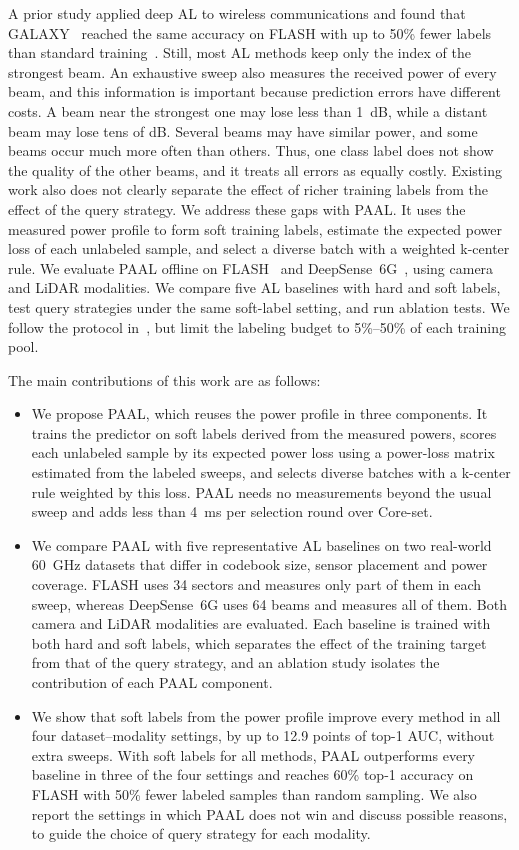 \documentclass[journal,onecolumn]{IEEEtran}
\begin{document}
A prior study applied deep AL to wireless communications and found that GALAXY~\cite{zhang2022galaxy} reached the same accuracy on FLASH with up to 50\% fewer labels than standard training~\cite{soltani2024learning}. Still, most AL methods keep only the index of the strongest beam. An exhaustive sweep also measures the received power of every beam, and this information is important because prediction errors have different costs. A beam near the strongest one may lose less than 1~dB, while a distant beam may lose tens of dB. Several beams may have similar power, and some beams occur much more often than others. Thus, one class label does not show the quality of the other beams, and it treats all errors as equally costly. Existing work also does not clearly separate the effect of richer training labels from the effect of the query strategy. We address these gaps with PAAL. It uses the measured power profile to form soft training labels, estimate the expected power loss of each unlabeled sample, and select a diverse batch with a weighted k-center rule. We evaluate PAAL offline on FLASH~\cite{salehi2022flash} and DeepSense~6G~\cite{alkhateeb2023deepsense}, using camera and LiDAR modalities. We compare five AL baselines with hard and soft labels, test query strategies under the same soft-label setting, and run ablation tests. We follow the protocol in~\cite{soltani2024learning}, but limit the labeling budget to 5\%--50\% of each training pool.

The main contributions of this work are as follows:
\begin{itemize}
  \item We propose PAAL, which reuses the power profile in three components. It trains the predictor on soft labels derived from the measured powers, scores each unlabeled sample by its expected power loss using a power-loss matrix estimated from the labeled sweeps, and selects diverse batches with a k-center rule weighted by this loss. PAAL needs no measurements beyond the usual sweep and adds less than 4~ms per selection round over Core-set.
  \item We compare PAAL with five representative AL baselines on two real-world 60~GHz datasets that differ in codebook size, sensor placement and power coverage. FLASH uses 34 sectors and measures only part of them in each sweep, whereas DeepSense~6G uses 64 beams and measures all of them. Both camera and LiDAR modalities are evaluated. Each baseline is trained with both hard and soft labels, which separates the effect of the training target from that of the query strategy, and an ablation study isolates the contribution of each PAAL component.
  \item We show that soft labels from the power profile improve every method in all four dataset--modality settings, by up to 12.9 points of top-1 AUC, without extra sweeps. With soft labels for all methods, PAAL outperforms every baseline in three of the four settings and reaches 60\% top-1 accuracy on FLASH with 50\% fewer labeled samples than random sampling. We also report the settings in which PAAL does not win and discuss possible reasons, to guide the choice of query strategy for each modality.
\end{itemize}
\end{document}

